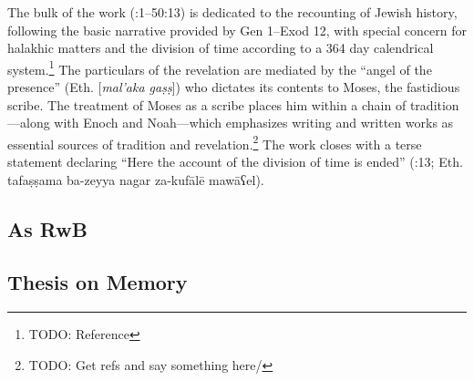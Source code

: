 The bulk of the work (:1--50:13) is dedicated to the recounting of Jewish history, following the basic narrative provided by Gen 1--Exod 12, with special concern for halakhic matters and the division of time according to a 364 day calendrical system.\footnote{TODO: Reference} The particulars of the revelation are mediated by the ``angel of the presence'' (Eth.  [\emph{mal'aka gaṣṣ}]) who dictates its contents to Moses, the fastidious scribe. The treatment of Moses as a scribe places him within a chain of tradition---along with Enoch and Noah---which emphasizes writing and written works as essential sources of tradition and revelation.\footnote{TODO: Get refs and say something here/} The work closes with a terse statement declaring ``Here the account of the division of time is ended'' (:13; Eth. 
        {tafaṣṣama ba-zeyya nagar za-kufālē mawāʕel}).

\subsection{As RwB}


\subsection{Thesis on Memory}
